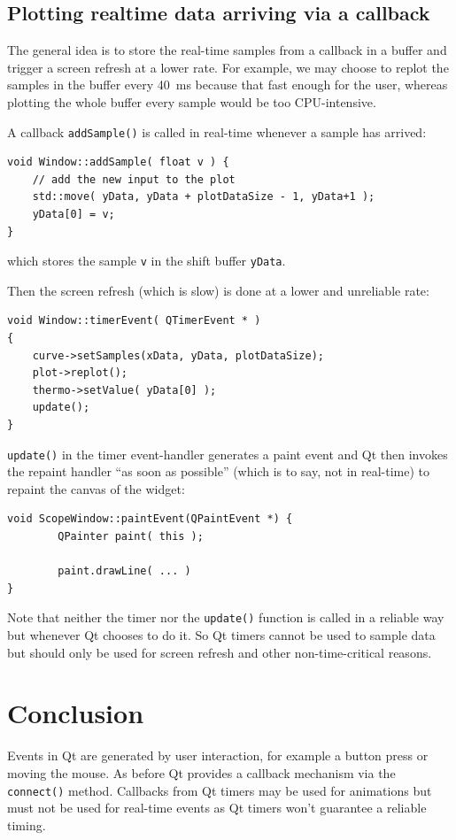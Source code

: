 \documentclass[12pt]{report}
\begin{document}
\subsection{Plotting realtime data arriving via a callback}
The general idea is to store the real-time samples from a callback in a
buffer and trigger a screen refresh at a lower rate. For example, we may
choose to replot the samples in the buffer every
40~ms because that fast enough for the user, whereas plotting the
whole buffer every sample would be too CPU-intensive.

A callback \texttt{addSample()} is called in real-time whenever
a sample has arrived:
\begin{verbatim}
void Window::addSample( float v ) {
    // add the new input to the plot
    std::move( yData, yData + plotDataSize - 1, yData+1 );
    yData[0] = v;
}
\end{verbatim}
which stores the sample \texttt{v} in the shift buffer \texttt{yData}.

Then the screen refresh (which is slow) is done at
a lower and unreliable rate:
\begin{verbatim}
void Window::timerEvent( QTimerEvent * )
{
    curve->setSamples(xData, yData, plotDataSize);
    plot->replot();
    thermo->setValue( yData[0] );
    update();
}
\end{verbatim}

\texttt{update()} in the timer event-handler generates a
paint event and Qt then invokes the repaint
handler ``as soon as possible'' (which is to say, not in real-time) to repaint
the canvas of the widget:
\begin{verbatim}
void ScopeWindow::paintEvent(QPaintEvent *) {
        QPainter paint( this );

        paint.drawLine( ... )
}
\end{verbatim}

Note that neither the timer nor the \texttt{update()} function
is called in a reliable way but whenever Qt chooses to do it.
So Qt timers cannot be used to sample data but should
only be used for screen refresh and other non-time-critical
reasons.

\section{Conclusion}
Events in Qt are generated by user interaction, for example a button
press or moving the mouse. As before Qt provides a callback mechanism
via the \texttt{connect()} method. Callbacks from Qt timers may be used for
animations but must not be used for real-time events as Qt timers won't
guarantee a reliable timing.
\end{document}
